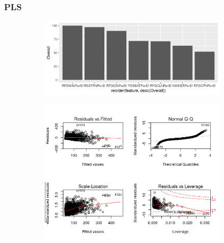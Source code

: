 \subsubsection{PLS}
\label{appendix:electricity:pls}
\begin{figure}[h]
\begin{subfigure}{1\textwidth}
\includegraphics[width=.99\textwidth, height=0.35\textheight]{Images/electricity_pls_vars.png}
\centering
\end{subfigure}
\begin{subfigure}{1\textwidth}
\includegraphics[width=.99\textwidth, height=0.42\textheight]{Images/electricity_pls_res.png}
\centering
\end{subfigure}
\end{figure}
\newpage
